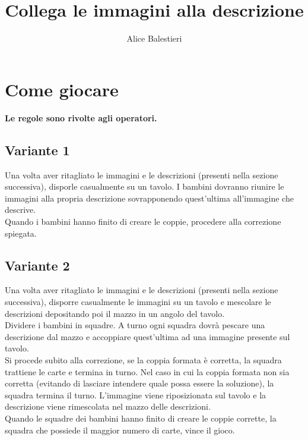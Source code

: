 \documentclass[hidelinks,12pt,a4paper]{article}
\begin{document}
	
	\title{\textbf{\\Collega le immagini alla descrizione}}
	\author{Alice Balestieri}
	\date{}
	
	\maketitle
	\newpage
	
	\tableofcontents
	\newpage
	
	\section{Come giocare}
	\begin{center}
		\textbf{Le regole sono rivolte agli operatori.}
	\end{center}
	
	\subsection{Variante 1}
	Una volta aver ritagliato le immagini e le descrizioni (presenti nella sezione successiva), disporle casualmente su un tavolo. I bambini dovranno riunire le immagini alla propria descrizione sovrapponendo quest'ultima all'immagine che descrive.\\
	Quando i bambini hanno finito di creare le coppie, procedere alla correzione spiegata.
	
	\subsection{Variante 2}
	Una volta aver ritagliato le immagini e le descrizioni (presenti nella sezione successiva), disporre casualmente le immagini su un tavolo e mescolare le descrizioni depositando poi il mazzo in un angolo del tavolo.\\
	 Dividere i bambini in squadre. A turno ogni squadra dovrà pescare una descrizione dal mazzo e accoppiare quest'ultima ad una immagine presente sul tavolo.\\
	Si procede subito alla correzione, se la coppia formata è corretta, la squadra trattiene le carte e termina in turno. Nel caso in cui la coppia formata non sia corretta (evitando di lasciare intendere quale possa essere la soluzione), la squadra termina il turno. L'immagine viene riposizionata sul tavolo e la descrizione viene rimescolata nel mazzo delle descrizioni.\\
	Quando le squadre dei bambini hanno finito di creare le coppie corrette, la squadra che possiede il maggior numero di carte, vince il gioco.
	
\end{document}
